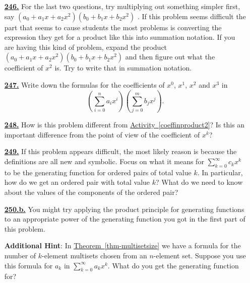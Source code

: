 \documentclass[10pt,]{book}
\theoremstyle{plain}
\theoremstyle{definition}
\theoremstyle{definition}
\theoremstyle{definition}
\numberwithin{equation}{chapter}
\begin{document}
\begin{itemize}[itemsep=1em]
\hypertarget{a-246}{}\item[\textbf{\hyperref[coeffinproduct1]{246.}}]
\hypertarget{p-1287}{}%
For the last two questions, try multiplying out something simpler first, say \((a_0 + a_1 x + a_2 x^2 )(b_0 + b_1 x + b_2 x^2 )\) . If this problem seems difficult the part that seems to cause students the most problems is converting the expression they get for a product like this into summation notation. If you are having this kind of problem, expand the product \((a_0 + a_1 x + a_2 x^2 )(b_0 + b_1 x + b_2 x^2 )\) and then figure out what the coefficient of \(x^2\) is. Try to write that in summation notation.%

\hypertarget{a-247}{}\item[\textbf{\hyperref[coeffinproduct2]{247.}}]
\hypertarget{p-1291}{}%
Write down the formulas for the coefficients of \(x^0\), \(x^1\), \(x^2\) and \(x^3\) in%
\begin{equation*}
\left(\sum_{i=0}^n a_ix^i\right)\left(\sum_{j=0}^m b_jx^j\right)\text{.}
\end{equation*}
%

\hypertarget{a-248}{}\item[\textbf{\hyperref[coeffinpowerseries]{248.}}]
\hypertarget{p-1294}{}%
How is this problem different from \hyperref[coeffinproduct2]{Activity~\ref{coeffinproduct2}}? Is this an important difference from the point of view of the coefficient of \(x^k\)?%

\hypertarget{a-249}{}\item[\textbf{\hyperref[ProductPrincipleOGF]{249.}}]
\hypertarget{p-1299}{}%
If this problem appears difficult, the most likely reason is because the definitions are all new and symbolic. Focus on what it means for \(\sum_{k=0}^\infty c_kx^k\) to be the generating function for ordered pairs of total value \(k\). In particular, how do we get an ordered pair with total value \(k\)? What do we need to know about the values of the components of the ordered pair?%

\hypertarget{a-250.b}{}\item[\textbf{\hyperref[task-243]{250.b.}}]
\hypertarget{p-1308}{}%
You might try applying the product principle for generating functions to an appropriate power of the generating function you got in the first part of this problem.%

\par\smallskip
\noindent\textbf{Additional Hint}: \hypertarget{p-1309}{}%
In \hyperref[thm-multisetsize]{Theorem~\ref{thm-multisetsize}} we have a formula for the number of \(k\)-element multisets chosen from an \(n\)-element set. Suppose you use this formula for \(a_k\) in \(\sum_{k=0}^\infty a_kx^k\). What do you get the generating function for?%


\end{itemize}
\end{document}
